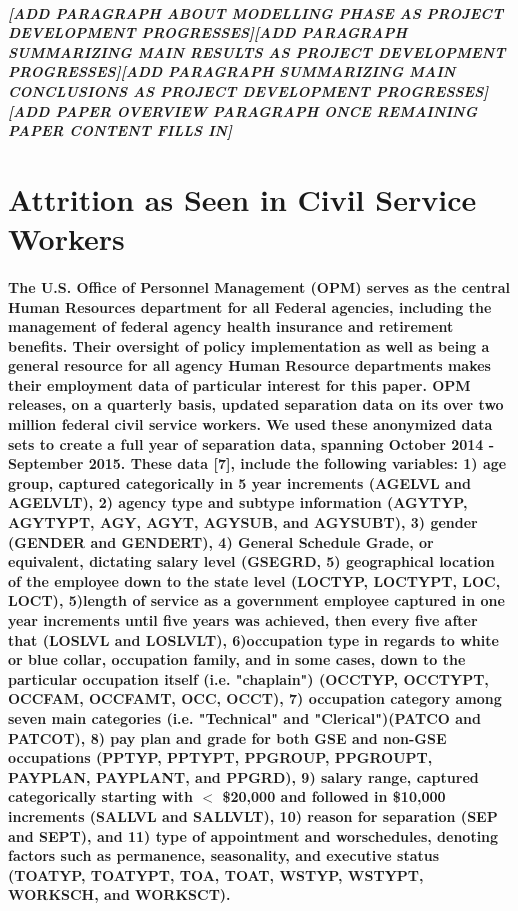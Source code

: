 \documentclass{article}
\begin{document}
\subparagraph{[ADD PARAGRAPH ABOUT MODELLING PHASE AS PROJECT DEVELOPMENT PROGRESSES][ADD PARAGRAPH SUMMARIZING MAIN RESULTS AS PROJECT DEVELOPMENT PROGRESSES][ADD PARAGRAPH SUMMARIZING MAIN CONCLUSIONS AS PROJECT DEVELOPMENT PROGRESSES][ADD PAPER OVERVIEW PARAGRAPH ONCE REMAINING PAPER CONTENT FILLS IN]}
  
\section{Attrition as Seen in Civil Service Workers}

\paragraph{The U.S. Office of Personnel Management (OPM) serves as the central Human Resources department for all Federal agencies, including the management of federal agency health insurance and retirement benefits. Their oversight of policy implementation as well as being a general resource for all agency Human Resource departments makes their employment data of particular interest for this paper. OPM releases, on a quarterly basis, updated separation data on its over two million federal civil service workers.  We used these anonymized data sets to create a full year of separation data, spanning October 2014 - September 2015.   These data [7], include the following variables: 1) age group, captured categorically in 5 year increments (AGELVL and AGELVLT), 2) agency type and subtype information (AGYTYP, AGYTYPT, AGY, AGYT, AGYSUB, and AGYSUBT), 3) gender (GENDER and GENDERT), 4) General Schedule Grade, or equivalent, dictating salary level (GSEGRD, 5) geographical location of the employee down to the state level (LOCTYP, LOCTYPT, LOC, LOCT), 5)length of service as a government employee captured in one year increments until five years was achieved, then every five after that (LOSLVL and LOSLVLT), 6)occupation type  in regards to white or blue collar, occupation family, and in some cases, down to the particular occupation itself (i.e. "chaplain") (OCCTYP, OCCTYPT, OCCFAM, OCCFAMT, OCC, OCCT), 7) occupation category among seven main categories (i.e. "Technical" and "Clerical")(PATCO and PATCOT), 8) pay plan and grade for both GSE and non-GSE occupations (PPTYP, PPTYPT, PPGROUP, PPGROUPT, PAYPLAN, PAYPLANT, and PPGRD), 9) salary range, captured categorically starting with $<$ \$20,000 and followed in \$10,000 increments (SALLVL and SALLVLT), 10) reason for separation (SEP and SEPT), and 11) type of appointment and worschedules, denoting factors such as permanence, seasonality, and executive status (TOATYP, TOATYPT, TOA, TOAT, WSTYP, WSTYPT, WORKSCH, and WORKSCT).   }
\end{document}
